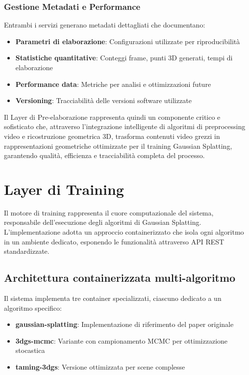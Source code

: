 \subsubsection{Gestione Metadati e Performance}

Entrambi i servizi generano metadati dettagliati che documentano:

\begin{itemize}
	\item \textbf{Parametri di elaborazione}: Configurazioni utilizzate per riproducibilità
	\item \textbf{Statistiche quantitative}: Conteggi frame, punti 3D generati, tempi di elaborazione
	\item \textbf{Performance data}: Metriche per analisi e ottimizzazioni future
	\item \textbf{Versioning}: Tracciabilità delle versioni software utilizzate
\end{itemize}

Il Layer di Pre-elaborazione rappresenta quindi un componente critico e sofisticato che, attraverso l'integrazione intelligente di algoritmi di preprocessing video e ricostruzione geometrica 3D, trasforma contenuti video grezzi in rappresentazioni geometriche ottimizzate per il training Gaussian Splatting, garantendo qualità, efficienza e tracciabilità completa del processo.

\section{Layer di Training}

Il motore di training rappresenta il cuore computazionale del sistema, responsabile dell'esecuzione degli algoritmi di Gaussian Splatting. L'implementazione adotta un approccio containerizzato che isola ogni algoritmo in un ambiente dedicato, esponendo le funzionalità attraverso API REST standardizzate.

\subsection{Architettura containerizzata multi-algoritmo}

Il sistema implementa tre container specializzati, ciascuno dedicato a un algoritmo specifico:

\begin{itemize}
	\item \textbf{gaussian-splatting}: Implementazione di riferimento del paper originale
	\item \textbf{3dgs-mcmc}: Variante con campionamento MCMC per ottimizzazione stocastica  
	\item \textbf{taming-3dgs}: Versione ottimizzata per scene complesse
\end{itemize}

